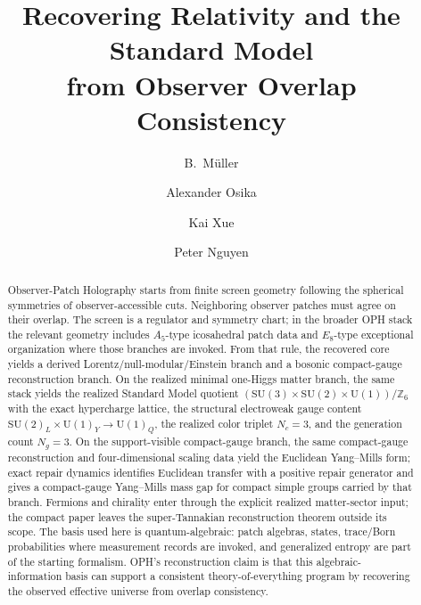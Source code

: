 \documentclass[11pt]{article}
\title{Recovering Relativity and the Standard Model\\
from Observer Overlap Consistency}
\author{B.\ M\"uller \and Alexander Osika \and Kai Xue \and Peter Nguyen}
\date{\OPHPaperReleaseDate}
\newcommand{\SU}{\mathrm{SU}}
\newcommand{\U}{\mathrm{U}}
\begin{document}
\maketitle
\OPHPaperReleaseBanner

\begin{abstract}
Observer-Patch Holography starts from finite screen geometry following the spherical symmetries of
observer-accessible cuts. Neighboring observer patches must agree on their overlap. The screen is a
regulator and symmetry chart; in the broader OPH stack the relevant geometry includes
\(A_5\)-type icosahedral patch data and \(E_8\)-type exceptional organization where those branches
are invoked. From that rule, the recovered core yields a derived Lorentz/null-modular/Einstein
branch and a bosonic compact-gauge reconstruction branch. On the realized minimal one-Higgs matter
branch, the same stack yields the realized Standard Model quotient
\(\left(\SU(3)\times\SU(2)\times\U(1)\right)/\mathbb Z_6\) with the exact hypercharge lattice, the
structural electroweak gauge content \(\SU(2)_L\times\U(1)_Y\to\U(1)_Q\), the realized color
triplet \(N_c=3\), and the generation count \(N_g=3\). On the support-visible compact-gauge branch,
the same compact-gauge reconstruction and four-dimensional scaling data yield the Euclidean
Yang--Mills form; exact repair dynamics identifies Euclidean transfer with a positive repair
generator and gives a compact-gauge Yang--Mills mass gap for compact simple groups carried by that
branch. Fermions and chirality enter through the explicit realized matter-sector input; the compact
paper leaves the super-Tannakian reconstruction theorem outside its scope. The basis used here is
quantum-algebraic: patch algebras, states, trace/Born probabilities where measurement records are
invoked, and generalized entropy are part of the starting formalism. OPH's reconstruction claim is
that this algebraic-information basis can support a consistent theory-of-everything program by
recovering the observed effective universe from overlap consistency.


\end{abstract}
\end{document}
